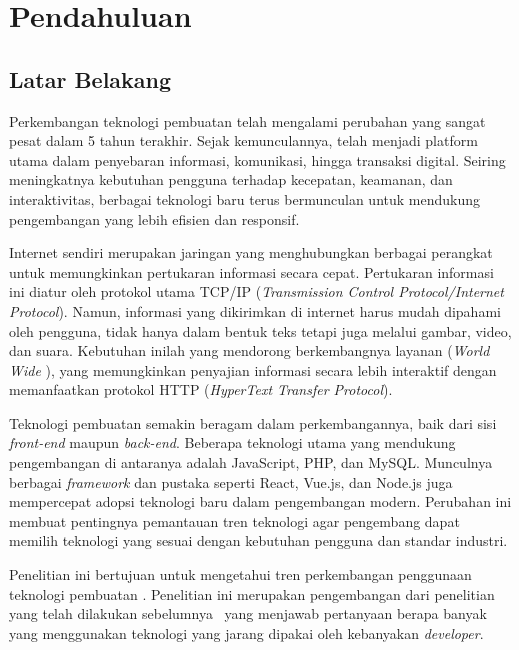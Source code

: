 \chapter{Pendahuluan}
\label{chap:intro}
   
\section{Latar Belakang}
\label{sec:label}

Perkembangan teknologi pembuatan \web telah mengalami perubahan yang sangat pesat dalam 5 tahun terakhir. Sejak kemunculannya, \web telah menjadi platform utama dalam penyebaran informasi, komunikasi, hingga transaksi digital. Seiring meningkatnya kebutuhan pengguna terhadap kecepatan, keamanan, dan interaktivitas, berbagai teknologi baru terus bermunculan untuk mendukung pengembangan \web yang lebih efisien dan responsif.

Internet sendiri merupakan jaringan yang menghubungkan berbagai perangkat untuk memungkinkan pertukaran informasi secara cepat. Pertukaran informasi ini diatur oleh protokol utama TCP/IP (\textit{Transmission Control Protocol/Internet Protocol}). Namun, informasi yang dikirimkan di internet harus mudah dipahami oleh pengguna, tidak hanya dalam bentuk teks tetapi juga melalui gambar, video, dan suara. Kebutuhan inilah yang mendorong berkembangnya layanan \web (\textit{World Wide \web}), yang memungkinkan penyajian informasi secara lebih interaktif dengan memanfaatkan protokol HTTP (\textit{HyperText Transfer Protocol}).

Teknologi pembuatan \web semakin beragam dalam perkembangannya, baik dari sisi \textit{front-end} maupun \textit{back-end}. Beberapa teknologi utama yang mendukung pengembangan \web di antaranya adalah JavaScript, PHP, dan MySQL. Munculnya berbagai \textit{framework} dan pustaka seperti React, Vue.js, dan Node.js juga mempercepat adopsi teknologi baru dalam pengembangan \web modern. Perubahan ini membuat pentingnya pemantauan tren teknologi \web agar pengembang dapat memilih teknologi yang sesuai dengan kebutuhan pengguna dan standar industri.

Penelitian ini bertujuan untuk mengetahui tren perkembangan penggunaan teknologi pembuatan \web. Penelitian ini merupakan pengembangan dari penelitian yang telah dilakukan sebelumnya~\cite{Nugroho} yang menjawab pertanyaan berapa banyak \web yang menggunakan teknologi yang jarang dipakai oleh kebanyakan \textit{developer}.

